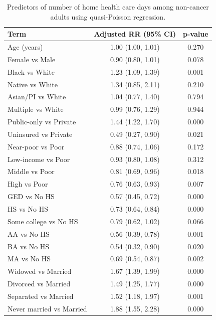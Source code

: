 
\begin{longtable}[t]{lcc}
\caption{\label{tab:tab:intensity-noncancer}Predictors of number of home health care days among non-cancer adults using quasi-Poisson regression.}\\
\toprule
Term & Adjusted RR (95\% CI) & p-value\\
\midrule
Age (years) & 1.00 (1.00, 1.01) & 0.270\\
Female vs Male & 0.90 (0.80, 1.01) & 0.078\\
Black vs White & 1.23 (1.09, 1.39) & 0.001\\
Native vs White & 1.34 (0.85, 2.11) & 0.210\\
Asian/PI vs White & 1.04 (0.77, 1.40) & 0.794\\
\addlinespace
Multiple vs White & 0.99 (0.76, 1.29) & 0.944\\
Public-only vs Private & 1.44 (1.22, 1.70) & 0.000\\
Uninsured vs Private & 0.49 (0.27, 0.90) & 0.021\\
Near-poor vs Poor & 0.88 (0.74, 1.06) & 0.172\\
Low-income vs Poor & 0.93 (0.80, 1.08) & 0.312\\
\addlinespace
Middle vs Poor & 0.81 (0.69, 0.96) & 0.018\\
High vs Poor & 0.76 (0.63, 0.93) & 0.007\\
GED vs No HS & 0.57 (0.45, 0.72) & 0.000\\
HS vs No HS & 0.73 (0.64, 0.84) & 0.000\\
Some college vs No HS & 0.79 (0.62, 1.02) & 0.066\\
\addlinespace
AA vs No HS & 0.56 (0.39, 0.78) & 0.001\\
BA vs No HS & 0.54 (0.32, 0.90) & 0.020\\
MA vs No HS & 0.69 (0.54, 0.87) & 0.002\\
Widowed vs Married & 1.67 (1.39, 1.99) & 0.000\\
Divorced vs Married & 1.49 (1.25, 1.77) & 0.000\\
\addlinespace
Separated vs Married & 1.52 (1.18, 1.97) & 0.001\\
Never married vs Married & 1.88 (1.55, 2.28) & 0.000\\
\bottomrule
\end{longtable}
